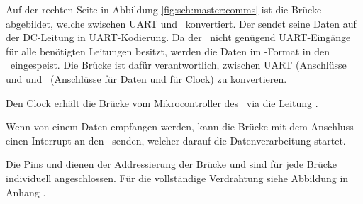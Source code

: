 Auf der rechten Seite in Abbildung \ref{fig:sch:master:comms} ist die Br\"ucke
 abgebildet, welche zwischen UART  und \ISC~konvertiert.  Der \Sensor
sendet seine Daten  auf der DC-Leitung in UART-Kodierung. Da  der \Raspi~nicht
gen\"ugend UART-Eing\"ange  f\"ur alle ben\"otigten Leitungen  besitzt, werden
die Daten im \ISC-Format in den \Raspi~eingespeist. Die Br\"ucke  ist
daf\"ur verantwortlich,  zwischen UART  (Anschl\"usse   und 
und \ISC~(Anschl\"usse   f\"ur Daten und   f\"ur Clock) zu
konvertieren.

Den Clock erh\"alt die Br\"ucke vom Mikrocontroller des \Raspi~via die Leitung
.

Wenn  von einem  \Sensor Daten  empfangen werden,  kann die  Br\"ucke mit  dem
Anschluss  einen Interrupt an den \Raspi~senden, welcher darauf die
Datenverarbeitung startet.

Die Pins   und   dienen der  Addressierung der  Br\"ucke und
sind f\"ur  jede Br\"ucke individuell angeschlossen. F\"ur  die vollst\"andige
Verdrahtung siehe Abbildung  in Anhang .

